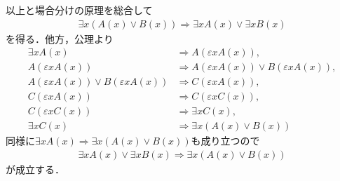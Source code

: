 \begin{prf}
		以上と場合分けの原理を総合して
		\begin{align}
			\exists x ( A(x) \vee B(x) ) \Longrightarrow \exists x A(x) \vee \exists x B(x)
		\end{align}
		を得る．他方，公理より
		\begin{align}
			\exists x A(x) &\Longrightarrow A(\varepsilon x A(x)), \\
			A(\varepsilon x A(x)) &\Longrightarrow A(\varepsilon x A(x)) \vee B(\varepsilon x A(x)), \\
			A(\varepsilon x A(x)) \vee B(\varepsilon x A(x)) &\Longrightarrow C(\varepsilon x A(x)), \\
			C(\varepsilon x A(x)) &\Longrightarrow C(\varepsilon x C(x)), \\
			C(\varepsilon x C(x)) &\Longrightarrow \exists x C(x), \\
			\exists x C(x) &\Longrightarrow \exists x (A(x) \vee B(x))
		\end{align}
		同様に$\exists x A(x) \Longrightarrow \exists x (A(x) \vee B(x))$も成り立つので
		\begin{align}
			\exists x A(x) \vee \exists x B(x) \Longrightarrow \exists x (A(x) \vee B(x))
		\end{align}
		が成立する．
		\QED
	\end{prf}